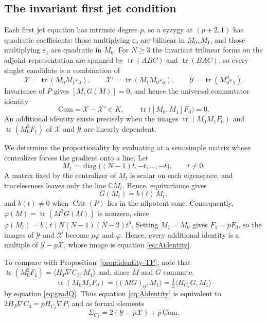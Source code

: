 \documentclass[10pt,reqno]{amsart}
\numberwithin{equation}{section}
\theoremstyle{plain}
\theoremstyle{definition}
\DeclareMathOperator{\tr}{tr}
\DeclareMathOperator{\Crit}{Crit}
\DeclareMathOperator{\diag}{diag}
\newcommand{\ip}[2]{\langle #1, #2\rangle}
\begin{document}
\subsection{The invariant first jet condition}\label{sec:Acondition}

Each first jet equation has intrinsic degree $p$, so a syzygy at $(p+2,1)$ has quadratic coefficients: those multiplying $\varepsilon_0$ are bilinear in $M_0,M_1$, and those multiplying $\varepsilon_1$ are quadratic in $M_0$. For $N\ge3$ the invariant trilinear forms on the adjoint representation are spanned by $\tr(ABC)$ and $\tr(BAC)$, so every singlet candidate is a combination of
\begin{equation*}
	\mathcal{X}=\tr(M_0M_1\varepsilon_0),\qquad \mathcal{X}'=\tr(M_1M_0\varepsilon_0),\qquad \mathcal{Y}=\tr(M_0^2\varepsilon_1).
\end{equation*}
Invariance of $P$ gives $[M,G(M)]=0$, and hence the universal commutator identity
\begin{equation*}
	\mathrm{Com}=\mathcal{X}-\mathcal{X}'\in K,\qquad \tr\big([M_0,M_1]F_0\big)=0 .
\end{equation*}
An additional identity exists precisely when the images $\tr(M_0M_1F_0)$ and $\tr(M_0^2F_1)$ of $\mathcal{X}$ and $\mathcal{Y}$ are linearly dependent.

We determine the proportionality by evaluating at a semisimple matrix whose centralizer forces the gradient onto a line. Let
\begin{equation}\label{eq:Mt}
	M_t=\diag\big((N-1)t,-t,\dots,-t\big),\qquad t\neq0 .
\end{equation}
A matrix fixed by the centralizer of $M_t$ is scalar on each eigenspace, and tracelessness leaves only the line $\mathbb{C} M_t$. Hence, equivariance gives
\begin{equation*}
	G(M_t)=b(t)\,M_t ,
\end{equation*}
and $b(t)\neq0$ when $\Crit(P)$ lies in the nilpotent cone. Consequently, $\varphi(M)=\tr(M^2G(M))$ is nonzero, since $\varphi(M_t)=b(t)N(N-1)(N-2)t^3$. Setting $M_1=M_0$ gives $F_1=pF_0$, so the images of $\mathcal{Y}$ and $\mathcal{X}$ become $p\varphi$ and $\varphi$. Hence, every additional identity is a multiple of $\mathcal{Y}-p\mathcal{X}$, whose image is equation \eqref{eq:Aidentity}.

To compare with Proposition~\ref{prop:identity-TP}, note that $\tr(M_0^2F_1)=\ip{H_P\nabla C_3}{M_1}$ and, since $M$ and $G$ commute, 
\begin{equation*}
    \tr(M_0M_1F_0)=\ip{(MG)_0}{M_1}=\tfrac12\ip{H_{C_3}G}{M_1}
\end{equation*}
by equation \eqref{eq:gradQ}. Thus equation \eqref{eq:Aidentity} is equivalent to $2H_P\nabla C_3=pH_{C_3}\nabla P$, and as formal elements
\begin{equation}\label{eq:SigmaC3}
	\Sigma_{C_3}=2(\mathcal{Y}-p\mathcal{X})+p\,\mathrm{Com} .
\end{equation}
\end{document}
